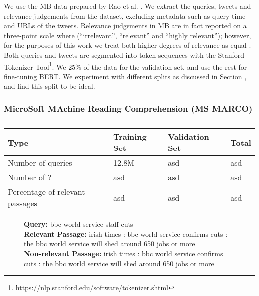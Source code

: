 We use the MB data prepared by Rao et al. \cite{rao2019tweet}.
We extract the queries, tweets and relevance judgements from the dataset, excluding metadata such as query time and URLs of the tweets.
Relevance judgements in MB are in fact reported on a three-point scale where (``irrelevant'', ``relevant'' and ``highly relevant''); however, for the purposes of this work we treat both higher degrees of relevance as equal \cite{ounisoverview}.
Both queries and tweets are segmented into token sequences with the Stanford Tokenizer Tool\footnote{https://nlp.stanford.edu/software/tokenizer.shtml}.
We  25\% of the data for the validation set, and use the rest for fine-tuning BERT.
We experiment with different splits as discussed in Section , and find this split to be ideal.

\subsubsection{MicroSoft MAchine Reading Comprehension (MS MARCO)}

\begin{table}[b]
\vspace{0.2cm}
\centering
\begin{tabular}{llll}
\toprule
\textbf{Type} \mbox{\hspace{0.5cm}} & \textbf{Training Set} \mbox{\hspace{1.0cm}} & \textbf{Validation Set} \mbox{\hspace{1.0cm}} & \textbf{Total} \mbox{\hspace{1.0cm}} \\
\toprule
Number of queries & 12.8M & asd & asd \\
Number  of ? & asd & asd & asd \\
Percentage of relevant passages  & asd      & asd & asd   \\
\bottomrule
\end{tabular}
\vspace{0.2cm}
\caption{}
\label{tab:marco-stats}
\vspace{-0.6cm}
\end{table}

\begin{figure}[b!]
	\begin{framed}
		\centering
    		\textbf{Query:} bbc world service staff cuts \\
    		\textbf{Relevant Passage:} irish times : bbc world service confirms cuts : the bbc world service will shed around 650 jobs or more \\
    		\textbf{Non-relevant Passage:} irish times : bbc world service confirms cuts : the bbc world service will shed around 650 jobs or more \\
	\end{framed}
\label{marco-example}
 \caption{}
\end{figure}

